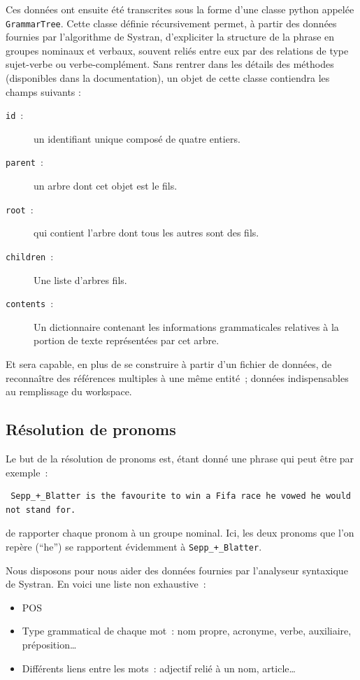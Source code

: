 \documentclass[a4paper, 12pt]{article}
\newcommand{\pyt}[1]{\texttt{#1}}%
\begin{document}
Ces données ont ensuite été transcrites sous la forme d'une classe python appelée \pyt{GrammarTree}. Cette classe définie récursivement permet, à partir des données fournies par l'algorithme de Systran, d'expliciter la structure de la phrase en groupes nominaux et verbaux, souvent reliés entre eux par des relations de type sujet-verbe ou verbe-complément. Sans rentrer dans les détails des méthodes (disponibles dans la documentation), un objet de cette classe contiendra les champs suivants :
\begin{description}
    \item[\pyt{id}~:] un identifiant unique composé de quatre entiers.
    \item[\pyt{parent}~:] un arbre dont cet objet est le fils.
    \item[\pyt{root}~:] qui contient l'arbre dont tous les autres sont des fils.
    \item[\pyt{children}~:] Une liste d'arbres fils.
    \item[\pyt{contents}~:] Un dictionnaire contenant les informations grammaticales relatives à la portion de texte représentées par cet arbre.
\end{description}

Et sera capable, en plus de se construire à partir d'un fichier de données, de reconnaître des références multiples à une même entité~; données indispensables au remplissage du workspace.

\subsection{Résolution de pronoms}

Le but de la résolution de pronoms est, étant donné une phrase qui peut être par exemple~:

\begin{verbatim}
 Sepp_+_Blatter is the favourite to win a Fifa race he vowed he would not stand for.
\end{verbatim}
de rapporter chaque pronom à un groupe nominal. Ici, les deux pronoms que l'on repère (``he'') se rapportent évidemment à \verb|Sepp_+_Blatter|.

Nous disposons pour nous aider des données fournies par l'analyseur syntaxique de Systran. En voici une liste non exhaustive~:
\begin{itemize}
 \item POS
 \item Type grammatical de chaque mot~: nom propre, acronyme, verbe, auxiliaire, préposition\ldots{}
 \item Différents liens entre les mots~: adjectif relié à un nom, article\ldots{}
\end{itemize}
\end{document}
